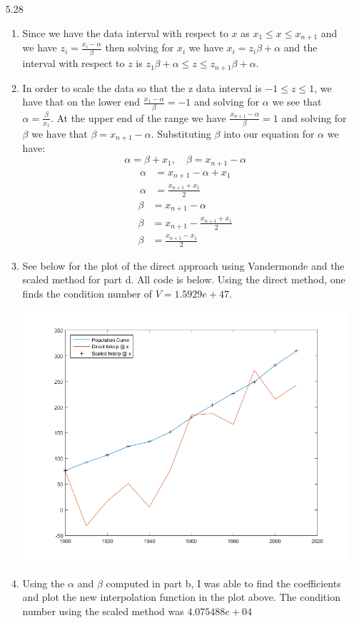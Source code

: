 \documentclass[11pt,a4paper]{article}
\begin{document}
\begin{itemize}
			\item[5.28]
			
				\begin{enumerate} [label={\alph*)}]
					\item Since we have the data interval with respect to $x$ as $x_1\leq x \leq x_{n+1}$ and we have $z_i =\frac{x_i - \alpha}{\beta}$ then solving for $x_i$ we have $x_i = z_i\beta + \alpha$ and the interval with respect to $z$ is $z_1\beta+\alpha \leq z \leq z_{n+1}\beta + \alpha$. 
					\item In order to scale the data so that the z data interval is $-1 \leq z \leq 1$, we have that on the lower end $\frac{x_1-\alpha}{\beta}=-1$ and solving for $\alpha$ we see that $\alpha=\frac{\beta}{x_1}$. At the upper end of the range we have $\frac{x_{n+1}-\alpha}{\beta}=1$ and solving for $\beta$ we have that $\beta = x_{n+1}-\alpha$. Substituting $\beta$ into our equation for $\alpha$ we have:
					$$\alpha = \beta + x_1,\quad \beta = x_{n+1}-\alpha$$
					\begin{align*}
					\alpha &= x_{n+1}-\alpha + x_1 \\
					\alpha &= \frac{x_{n+1} + x_1}{2}
					\end{align*}
					\begin{align*}
					\beta &= x_{n+1}-\alpha \\
					\beta &= x_{n+1}-\frac{x_{n+1} + x_1}{2} \\
					\beta &= \frac{x_{n+1} - x_1}{2}
					\end{align*}
					
					\item See below for the plot of the direct approach using Vandermonde and the scaled method for part d. All code is below. Using the direct method, one finds the condition number of $V = 1.5929e+47$.
					\begin{center}
						\includegraphics[width=1\linewidth]{ch5q28}
					\end{center}
					\item Using the $\alpha$ and $\beta$ computed in part b, I was able to find the coefficients and plot the new interpolation function in the plot above. The condition number using the scaled method was $4.075488e+04$ 
				\end{enumerate}
			

\end{itemize}
\end{document}
